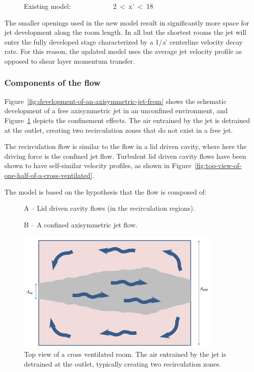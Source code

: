 ~~~~~ Existing model: ~~~~~~~~~~~ 2~\textless{}~x'~\textless{}~18

The smaller openings used in the new model result in significantly more space for jet development along the room length. In all but the shortest rooms the jet will enter the fully developed stage characterized by a 1/\emph{x}' centerline velocity decay rate. For this reason, the updated model uses the average jet velocity profile as opposed to shear layer momentum transfer.

\subsubsection{Components of the flow}\label{components-of-the-flow}

Figure~\ref{fig:development-of-an-axisymmetric-jet-from} shows the schematic development of a free axisymmetric jet in an unconfined environment, and Figure~\ref{fig:top-view-of-a-cross-ventilated-room.-the-air} depicts the confinement effects. The air entrained by the jet is detrained at the outlet, creating two recirculation zones that do not exist in a free jet.

The recirculation flow is similar to the flow in a lid driven cavity, where here the driving force is the confined jet flow. Turbulent lid driven cavity flows have been shown to have self-similar velocity profiles, as shown in Figure~\ref{fig:top-view-of-one-half-of-a-cross-ventilated}.

The model is based on the hypothesis that the flow is composed of:

~~~~~ A -- Lid driven cavity flows (in the recirculation regions).

~~~~~ B -- A confined axisymmetric jet flow.

\begin{figure}[hbtp] %
\centering
\includegraphics[width=0.9\textwidth, height=0.9\textheight, keepaspectratio=true]{media/image2623.png}
\caption{Top view of a cross ventilated room. The air entrained by the jet is detrained at the outlet, typically creating two recirculation zones. \protect \label{fig:top-view-of-a-cross-ventilated-room.-the-air}}
\end{figure}

